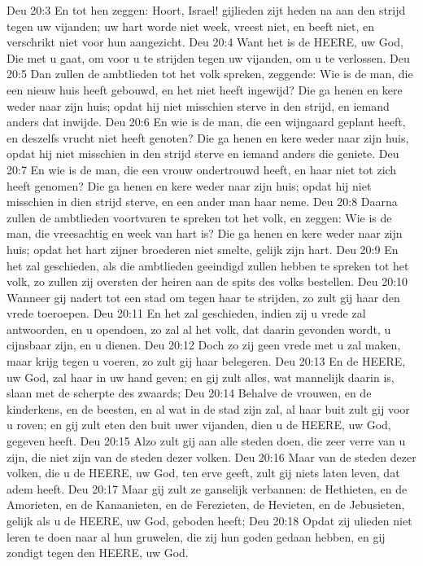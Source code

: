 Deu 20:3  En tot hen zeggen: Hoort, Israel! gijlieden zijt heden na aan den strijd tegen uw vijanden; uw hart worde niet week, vreest niet, en beeft niet, en verschrikt niet voor hun aangezicht.
Deu 20:4  Want het is de HEERE, uw God, Die met u gaat, om voor u te strijden tegen uw vijanden, om u te verlossen.
Deu 20:5  Dan zullen de ambtlieden tot het volk spreken, zeggende: Wie is de man, die een nieuw huis heeft gebouwd, en het niet heeft ingewijd? Die ga henen en kere weder naar zijn huis; opdat hij niet misschien sterve in den strijd, en iemand anders dat inwijde.
Deu 20:6  En wie is de man, die een wijngaard geplant heeft, en deszelfs vrucht niet heeft genoten? Die ga henen en kere weder naar zijn huis, opdat hij niet misschien in den strijd sterve en iemand anders die geniete.
Deu 20:7  En wie is de man, die een vrouw ondertrouwd heeft, en haar niet tot zich heeft genomen? Die ga henen en kere weder naar zijn huis; opdat hij niet misschien in dien strijd sterve, en een ander man haar neme.
Deu 20:8  Daarna zullen de ambtlieden voortvaren te spreken tot het volk, en zeggen: Wie is de man, die vreesachtig en week van hart is? Die ga henen en kere weder naar zijn huis; opdat het hart zijner broederen niet smelte, gelijk zijn hart.
Deu 20:9  En het zal geschieden, als die ambtlieden geeindigd zullen hebben te spreken tot het volk, zo zullen zij oversten der heiren aan de spits des volks bestellen.
Deu 20:10  Wanneer gij nadert tot een stad om tegen haar te strijden, zo zult gij haar den vrede toeroepen.
Deu 20:11  En het zal geschieden, indien zij u vrede zal antwoorden, en u opendoen, zo zal al het volk, dat daarin gevonden wordt, u cijnsbaar zijn, en u dienen.
Deu 20:12  Doch zo zij geen vrede met u zal maken, maar krijg tegen u voeren, zo zult gij haar belegeren.
Deu 20:13  En de HEERE, uw God, zal haar in uw hand geven; en gij zult alles, wat mannelijk daarin is, slaan met de scherpte des zwaards;
Deu 20:14  Behalve de vrouwen, en de kinderkens, en de beesten, en al wat in de stad zijn zal, al haar buit zult gij voor u roven; en gij zult eten den buit uwer vijanden, dien u de HEERE, uw God, gegeven heeft.
Deu 20:15  Alzo zult gij aan alle steden doen, die zeer verre van u zijn, die niet zijn van de steden dezer volken.
Deu 20:16  Maar van de steden dezer volken, die u de HEERE, uw God, ten erve geeft, zult gij niets laten leven, dat adem heeft.
Deu 20:17  Maar gij zult ze ganselijk verbannen: de Hethieten, en de Amorieten, en de Kanaanieten, en de Ferezieten, de Hevieten, en de Jebusieten, gelijk als u de HEERE, uw God, geboden heeft;
Deu 20:18  Opdat zij ulieden niet leren te doen naar al hun gruwelen, die zij hun goden gedaan hebben, en gij zondigt tegen den HEERE, uw God.

